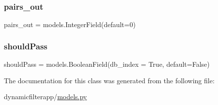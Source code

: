 \subsubsection{\texorpdfstring{pairs\+\_\+out}{pairs\_out}}
{\footnotesize\ttfamily pairs\+\_\+out = models.\+Integer\+Field(default=0)\hspace{0.3cm}{\ttfamily [static]}}

\mbox{\label{classdynamicfilterapp_1_1models_1_1_item_a1abc5225054f7c37dcefe2ca69594650}} 
\subsubsection{\texorpdfstring{should\+Pass}{shouldPass}}
{\footnotesize\ttfamily should\+Pass = models.\+Boolean\+Field(db\+\_\+index = True, default=False)\hspace{0.3cm}{\ttfamily [static]}}



The documentation for this class was generated from the following file\+:\begin{DoxyCompactItemize}
\item 
dynamicfilterapp/\hyperlink{models_8py}{models.\+py}\end{DoxyCompactItemize}
